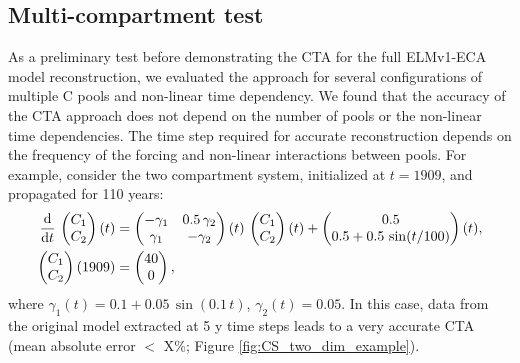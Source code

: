 \documentclass[11pt,a4paper]{article}
\newcommand{\deriv}[1]{\frac{\mathrm{d}}{\mathrm{d}#1}}
\begin{document}
\subsection{Multi-compartment test}
    As a preliminary test before demonstrating the CTA for the full ELMv1-ECA model reconstruction, we evaluated the approach for several configurations of multiple C pools and non-linear time dependency. We found that the accuracy of the CTA approach does not depend on the number of pools or the non-linear time dependencies. The time step required for accurate reconstruction depends on the frequency of the forcing and non-linear interactions between pools. For example, consider the two compartment system, initialized at $t=1909$, and propagated for 110 years:
    \begin{equation}\label{eqn:CS_two_dim_example}
        \begingroup\makeatletter\def\f@size{10}\check@mathfonts
        \begin{aligned}
            \deriv{t}\,\begin{pmatrix} C_1 \\ C_2 \end{pmatrix}(t) &= 
            \begin{pmatrix} -\gamma_1 & 0.5\,\gamma_2 \\ \gamma_1 & -\gamma_2 \end{pmatrix}(t)\,
            \begin{pmatrix} C_1 \\ C_2 \end{pmatrix}(t) + 
            \begin{pmatrix} 0.5 \\ 0.5 + 0.5\,\sin(t/100) \end{pmatrix}(t),\\
            \begin{pmatrix} C_1 \\ C_2 \end{pmatrix}(1909) &=
            \begin{pmatrix} 40 \\ 0 \end{pmatrix},
        \end{aligned}
        \endgroup
    \end{equation}
    where $\gamma_1(t)=0.1+0.05\,\sin(0.1\,t)$, $\gamma_2(t)=0.05$.
     In this case, data from the original model extracted at 5 y time steps leads to a very accurate CTA (mean absolute error $<$ X\%; Figure \ref{fig:CS_two_dim_example}).
\end{document}
